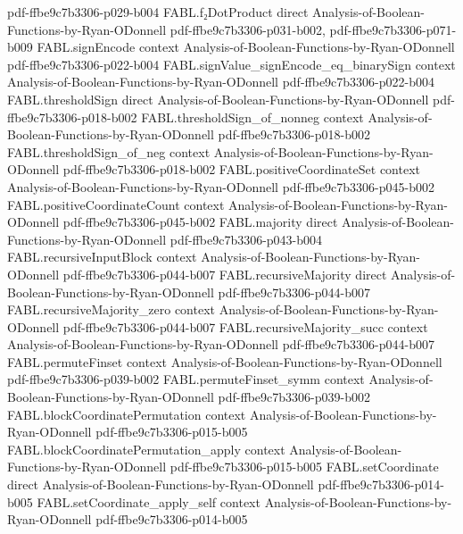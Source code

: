 \begin{theorem}
  {pdf-ffbe9c7b3306-p029-b004}
\proofstep
  {FABL.f₂DotProduct}
  {direct}
  {Analysis-of-Boolean-Functions-by-Ryan-ODonnell}
  {pdf-ffbe9c7b3306-p031-b002,
    pdf-ffbe9c7b3306-p071-b009}
\proofstep
  {FABL.signEncode}
  {context}
  {Analysis-of-Boolean-Functions-by-Ryan-ODonnell}
  {pdf-ffbe9c7b3306-p022-b004}
\proofstep
  {FABL.signValue_signEncode_eq_binarySign}
  {context}
  {Analysis-of-Boolean-Functions-by-Ryan-ODonnell}
  {pdf-ffbe9c7b3306-p022-b004}
\proofstep
  {FABL.thresholdSign}
  {direct}
  {Analysis-of-Boolean-Functions-by-Ryan-ODonnell}
  {pdf-ffbe9c7b3306-p018-b002}
\proofstep
  {FABL.thresholdSign_of_nonneg}
  {context}
  {Analysis-of-Boolean-Functions-by-Ryan-ODonnell}
  {pdf-ffbe9c7b3306-p018-b002}
\proofstep
  {FABL.thresholdSign_of_neg}
  {context}
  {Analysis-of-Boolean-Functions-by-Ryan-ODonnell}
  {pdf-ffbe9c7b3306-p018-b002}
\proofstep
  {FABL.positiveCoordinateSet}
  {context}
  {Analysis-of-Boolean-Functions-by-Ryan-ODonnell}
  {pdf-ffbe9c7b3306-p045-b002}
\proofstep
  {FABL.positiveCoordinateCount}
  {context}
  {Analysis-of-Boolean-Functions-by-Ryan-ODonnell}
  {pdf-ffbe9c7b3306-p045-b002}
\proofstep
  {FABL.majority}
  {direct}
  {Analysis-of-Boolean-Functions-by-Ryan-ODonnell}
  {pdf-ffbe9c7b3306-p043-b004}
\proofstep
  {FABL.recursiveInputBlock}
  {context}
  {Analysis-of-Boolean-Functions-by-Ryan-ODonnell}
  {pdf-ffbe9c7b3306-p044-b007}
\proofstep
  {FABL.recursiveMajority}
  {direct}
  {Analysis-of-Boolean-Functions-by-Ryan-ODonnell}
  {pdf-ffbe9c7b3306-p044-b007}
\proofstep
  {FABL.recursiveMajority_zero}
  {context}
  {Analysis-of-Boolean-Functions-by-Ryan-ODonnell}
  {pdf-ffbe9c7b3306-p044-b007}
\proofstep
  {FABL.recursiveMajority_succ}
  {context}
  {Analysis-of-Boolean-Functions-by-Ryan-ODonnell}
  {pdf-ffbe9c7b3306-p044-b007}
\proofstep
  {FABL.permuteFinset}
  {context}
  {Analysis-of-Boolean-Functions-by-Ryan-ODonnell}
  {pdf-ffbe9c7b3306-p039-b002}
\proofstep
  {FABL.permuteFinset_symm}
  {context}
  {Analysis-of-Boolean-Functions-by-Ryan-ODonnell}
  {pdf-ffbe9c7b3306-p039-b002}
\proofstep
  {FABL.blockCoordinatePermutation}
  {context}
  {Analysis-of-Boolean-Functions-by-Ryan-ODonnell}
  {pdf-ffbe9c7b3306-p015-b005}
\proofstep
  {FABL.blockCoordinatePermutation_apply}
  {context}
  {Analysis-of-Boolean-Functions-by-Ryan-ODonnell}
  {pdf-ffbe9c7b3306-p015-b005}
\proofstep
  {FABL.setCoordinate}
  {direct}
  {Analysis-of-Boolean-Functions-by-Ryan-ODonnell}
  {pdf-ffbe9c7b3306-p014-b005}
\proofstep
  {FABL.setCoordinate_apply_self}
  {context}
  {Analysis-of-Boolean-Functions-by-Ryan-ODonnell}
  {pdf-ffbe9c7b3306-p014-b005}

\end{theorem}
